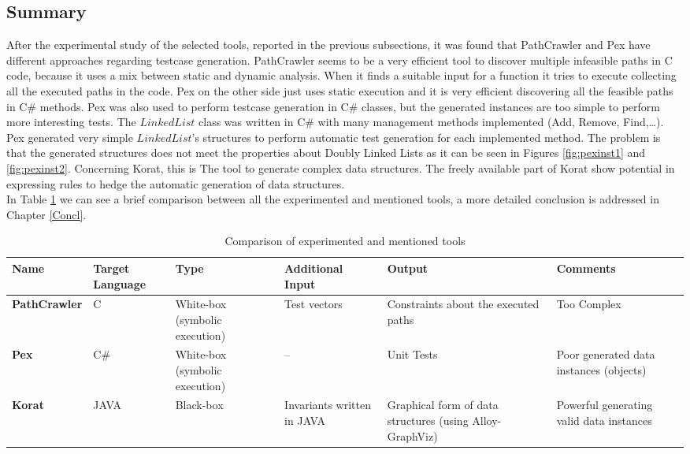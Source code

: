 \subsection{Summary}
After the experimental study of the selected tools, reported in the previous subsections, it was found that PathCrawler and Pex have different
approaches regarding testcase generation. PathCrawler seems to be a very efficient tool to discover multiple
infeasible paths in C code, because it uses a mix between static and dynamic analysis. When it finds a suitable input for a function it tries to execute
collecting all the executed paths in the code.
Pex on the other side just uses static execution and it is very efficient discovering all the feasible paths in C\# methods. Pex was also used
to perform testcase generation in C\# classes, but the generated instances are too simple to perform more interesting tests. The $LinkedList$ class was written
in C\# with many management methods implemented (Add, Remove, Find,\ldots). Pex generated very simple $LinkedList$'s structures to perform automatic test generation
for each implemented method. The problem is that the generated structures does not meet the properties about Doubly Linked Lists as it can be seen in Figures \ref{fig:pexinst1} and \ref{fig:pexinst2}.
Concerning Korat, this is The tool to generate complex data structures. The freely available part of Korat show potential in expressing rules to hedge
the automatic generation of data structures.\\
In Table \ref{tab:tabcmp} we can see a brief comparison between all the experimented and mentioned tools, a more detailed conclusion is addressed in Chapter \ref{Concl}.

\begin{table}[!ht]
\centering
\begin{tabular}{|m{2.5cm}|m{1cm}|m{2cm}|m{2cm}|m{3.5cm}|m{3.5cm}|}\hline
\textbf{Name} & \textbf{Target Language} & \textbf{Type} & \textbf{Additional Input} & \textbf{Output} & \textbf{Comments}\\\hline
\textbf{PathCrawler} & C & White-box (symbolic execution) & Test vectors & Constraints about the executed paths & Too Complex\\\hline
\textbf{Pex} & C\# & White-box (symbolic execution) & -- & Unit Tests & Poor generated data instances (objects)\\\hline
\textbf{Korat} & JAVA & Black-box & Invariants written in JAVA & Graphical form of data structures (using Alloy-GraphViz) & Powerful generating valid data instances\\\hline
\end{tabular}
\caption{Comparison of experimented and mentioned tools}
\label{tab:tabcmp}
\end{table}


